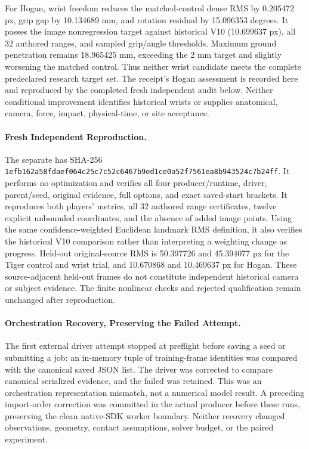 \documentclass[11pt,letterpaper]{article}
\newcommand{\hash}[1]{{\footnotesize\nolinkurl{#1}}}
\begin{document}
For Hogan, wrist freedom reduces the matched-control dense RMS by 0.205472 px,
grip gap by 10.134689 mm, and rotation residual by 15.096353 degrees. It passes
the image nonregression target against historical V10 (10.699637 px), all
32 authored ranges, and sampled grip/angle thresholds. Maximum ground
penetration remains 18.965425 mm, exceeding the 2 mm target and slightly
worsening the matched control. Thus neither wrist candidate meets the complete
predeclared research target set. The receipt's Hogan assessment is recorded
here and reproduced by the completed fresh independent audit below.
Neither conditional improvement identifies historical wrists or supplies
anatomical, camera, force, impact, physical-time, or site acceptance.

\paragraph{Fresh Independent Reproduction.}
The separate  has SHA-256
\hash{1efb162a58fdaef064c25c7c52c6467b9ed1ce0a52f7561ea8b943524c7b24ff}.
It performs no optimization and verifies all four producer/runtime, driver,
parent/seed, original evidence, full options, and exact saved-start brackets.
It reproduces both players' metrics, all 32 authored range certificates,
twelve explicit unbounded coordinates, and the absence of added image points.
Using the same confidence-weighted Euclidean landmark RMS definition, it also
verifies the historical V10 comparison rather than interpreting a weighting
change as progress. Held-out original-source RMS is 50.397726 and 45.394077 px
for the Tiger control and wrist trial, and 10.670868 and 10.469637 px for Hogan.
These source-adjacent held-out frames do not constitute independent historical
camera or subject evidence. The finite nonlinear checks and rejected
qualification remain unchanged after reproduction.

\paragraph{Orchestration Recovery, Preserving the Failed Attempt.}
The first external driver attempt stopped at preflight before saving a seed
or submitting a job: an in-memory tuple of training-frame identities was
compared with the canonical saved JSON list. The driver was corrected to
compare canonical serialized evidence, and the failed
 was retained. This was an orchestration
representation mismatch, not a numerical model result. A preceding import-order
correction was committed in the actual producer before these runs, preserving
the clean native-SDK worker boundary. Neither recovery changed observations,
geometry, contact assumptions, solver budget, or the paired experiment.
\end{document}
